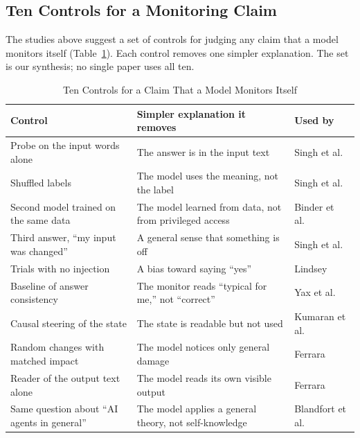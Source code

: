 \documentclass[journal]{IEEEtran}
\begin{document}
\subsection{Ten Controls for a Monitoring Claim}\label{sec:3.5}

The studies above suggest a set of controls for judging any claim that a model monitors itself (Table~\ref{tab:3}). Each control removes one simpler explanation. The set is our synthesis; no single paper uses all ten.

\begin{table}[!t]
\caption{Ten Controls for a Claim That a Model Monitors Itself}\label{tab:3}
\centering\footnotesize\renewcommand{\arraystretch}{1.15}
\begin{tabularx}{\textwidth}{@{}>{\raggedright\arraybackslash}p{}>{\raggedright\arraybackslash}X>{\raggedright\arraybackslash}p{}@{}}
\toprule
\textbf{Control} & \textbf{Simpler explanation it removes} & \textbf{Used by} \\
\midrule
Probe on the input words alone & The answer is in the input text & Singh et al.~\cite{Singh2026} \\
Shuffled labels & The model uses the meaning, not the label & Singh et al.~\cite{Singh2026} \\
Second model trained on the same data & The model learned from data, not from privileged access & Binder et al.~\cite{Binder2024} \\
Third answer, ``my input was changed'' & A general sense that something is off & Singh et al.~\cite{Singh2026} \\
Trials with no injection & A bias toward saying ``yes'' & Lindsey~\cite{Lindsey2025} \\
Baseline of answer consistency & The monitor reads ``typical for me,'' not ``correct'' & Yax et al.~\cite{Yax2026} \\
Causal steering of the state & The state is readable but not used & Kumaran et al.~\cite{Kumaran2026} \\
Random changes with matched impact & The model notices only general damage & Ferrara~\cite{Ferrara2026b} \\
Reader of the output text alone & The model reads its own visible output & Ferrara~\cite{Ferrara2026b} \\
Same question about ``AI agents in general'' & The model applies a general theory, not self-knowledge & Blandfort et al.~\cite{Blandfort2026} \\
\bottomrule
\end{tabularx}
\end{table}
\end{document}

